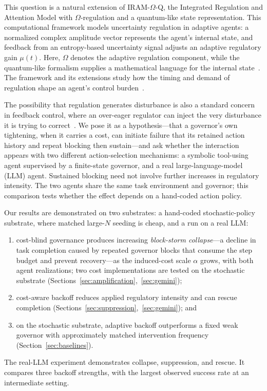 \documentclass[11pt]{article}
\begin{document}
This question is a natural extension of IRAM-$\Omega$-Q, the Integrated
Regulation and Attention Model with $\Omega$-regulation and a quantum-like
state representation. This computational framework models uncertainty
regulation in adaptive agents: a normalized complex amplitude vector
represents the agent's internal state, and feedback from an entropy-based
uncertainty signal adjusts an adaptive regulatory gain $\mu(t)$. Here,
$\Omega$ denotes the adaptive regulation component, while the quantum-like
formalism supplies a mathematical language for the internal
state~\cite{ziegler2026iramomegaq}. The framework and its extensions study how
the timing and demand of regulation shape an agent's control
burden~\cite{ziegler2026carryover,ziegler2026switching}.

The possibility that regulation generates disturbance is also a standard
concern in feedback control, where an over-eager regulator can inject the very
disturbance it is trying to correct~\cite{astrom2008feedback}. We pose it as a
hypothesis---that a governor's own tightening, when it carries a cost, can
initiate failure that its retained action history and repeat blocking then
sustain---and ask whether the interaction appears with two different
action-selection mechanisms: a symbolic tool-using agent supervised by a
finite-state governor, and a real large-language-model (LLM) agent. Sustained
blocking need not involve further increases in regulatory intensity. The two
agents share the same task environment and governor; this comparison tests
whether the effect depends on a hand-coded action policy.

Our results are demonstrated on two substrates: a hand-coded stochastic-policy
substrate, where matched large-$N$ seeding is cheap, and a run on a real
LLM:
\begin{enumerate}[leftmargin=1.4em]
\item cost-blind governance produces increasing \emph{block-storm
collapse}---a decline in task completion caused by repeated governor blocks
that consume the step budget and prevent recovery---as the induced-cost scale
$\alpha$ grows, with both agent realizations; two cost implementations are
tested on the stochastic substrate
(Sections~\ref{sec:amplification},~\ref{sec:gemini});
\item cost-aware backoff reduces applied regulatory intensity and can rescue
completion (Sections~\ref{sec:suppression},~\ref{sec:gemini}); and
\item on the stochastic substrate, adaptive backoff outperforms a fixed weak
governor with approximately matched intervention frequency
(Section~\ref{sec:baselines}).
\end{enumerate}
The real-LLM experiment demonstrates collapse, suppression, and rescue. It
compares three backoff strengths, with the largest observed success rate at an
intermediate setting.
\end{document}
